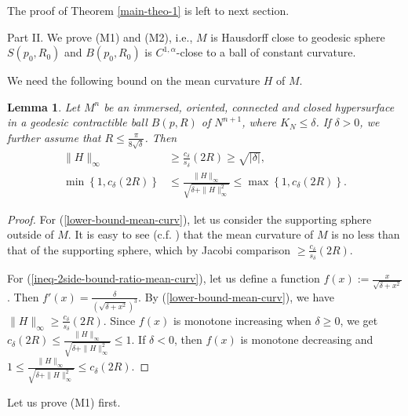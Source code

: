 \documentclass{amsart}
\numberwithin{equation}{section}
\newtheorem{lem}[theo]{Lemma}
\theoremstyle{remark}
\renewcommand{\(}{\left(}
\renewcommand{\)}{\right)}
\renewcommand{\~}{\tilde}
\renewcommand{\-}{\overline}
\renewcommand{\d}{\delta}
\begin{document}
The proof of Theorem \ref{main-theo-1} is left to next section.

Part II. We prove (M1) and (M2), i.e., $M$ is Hausdorff close to geodesic sphere $S(p_0,R_0)$ and $B(p_0,R_0)$ is $C^{1,\alpha}$-close to a ball of constant curvature.

We need the following bound on the mean curvature $H$ of $M$.

\begin{lem}\label{lem-bound-mean-curv}
	Let $M^n$ be an immersed, oriented, connected and closed hypersurface in a geodesic contractible  ball $B(p,R)$ of $N^{n+1}$, where $K_N \leq \d$. If $\d>0$, we further assume that $R\leq \frac{\pi}{8\sqrt{\d}}$. Then	
	\begin{align}\label{lower-bound-mean-curv}
	\|H\|_\infty &\geq \frac{c_\d}{s_\d}(2R)\ge \sqrt{|\d|},\\
	\label{ineq-2side-bound-ratio-mean-curv}
	\min\left\{1,c_\d(2R)\right\}& \leq \frac{\|H\|_\infty}{\sqrt{\d+\|H\|_\infty^2}} \leq  \max\left\{1,c_\d(2R)\right\}.
	\end{align}
\end{lem}
\begin{proof}
	For (\ref{lower-bound-mean-curv}), let us consider the supporting sphere outside of $M$. It is easy to see (c.f. \cite[Theorem 1]{Jorge-Xavier1981}) that the mean curvature of $M$ is no less than that of the supporting sphere, which by Jacobi comparison $\ge \frac{c_\d}{s_\d}(2R)$.
	
	For (\ref{ineq-2side-bound-ratio-mean-curv}), let us define a function $f(x):=\frac{x}{\sqrt{\d+x^2}}$. Then $f'(x)=\frac{\d}{(\sqrt{\d+x^2})^3}$. By (\ref{lower-bound-mean-curv}), we have $\|H\|_\infty\geq \frac{c_\d}{s_\d}(2R)$. Since $f(x)$ is monotone increasing when $\d\geq 0$, we get $c_\d(2R)\leq \frac{\|H\|_\infty}{\sqrt{\d+\|H\|_\infty^2}}\leq 1$. If $\d<0$, then $f(x)$ is monotone decreasing and $1\leq \frac{\|H\|_\infty}{\sqrt{\d+\|H\|_\infty^2}}\leq c_\d(2R)$.
\end{proof}

Let us prove (M1) first.
\end{document}
